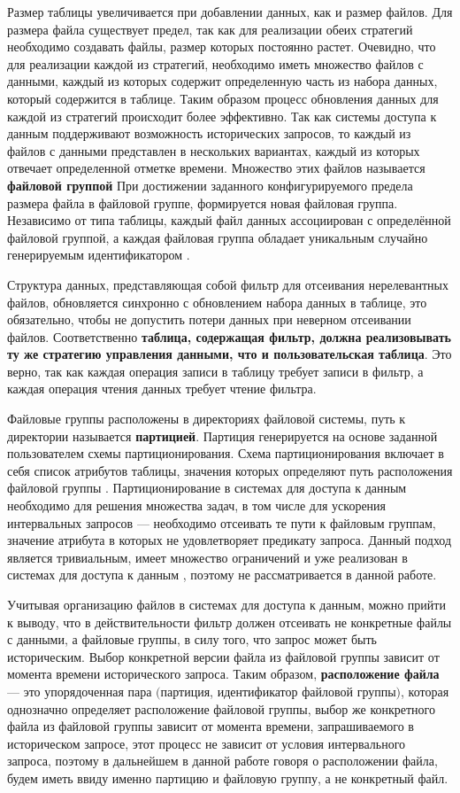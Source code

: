 Размер таблицы увеличивается при добавлении данных, как и размер файлов. Для размера файла существует предел, так как для реализации обеих стратегий необходимо создавать файлы, размер которых постоянно растет. Очевидно, что для реализации каждой из стратегий, необходимо иметь множество файлов с данными, каждый из которых содержит определенную часть из набора данных, который содержится в таблице. Таким образом процесс обновления данных для каждой из стратегий происходит более эффективно. Так как системы доступа к данным поддерживают возможность исторических запросов, то каждый из файлов с данными представлен в нескольких вариантах, каждый из которых отвечает определенной отметке времени. Множество этих файлов называется \textbf{файловой группой} При достижении заданного конфигурируемого предела размера файла в файловой группе, формируется новая файловая группа. Независимо от типа таблицы, каждый файл данных ассоциирован с определённой файловой группой, а каждая файловая группа обладает уникальным случайно генерируемым идентификатором \cite{Hudi_File_layouts}.

Структура данных, представляющая собой фильтр для отсеивания нерелевантных файлов, обновляется синхронно с обновлением набора данных в таблице, это обязательно, чтобы не допустить потери данных при неверном отсеивании файлов. Соответственно \textbf{таблица, содержащая фильтр, должна реализовывать ту же стратегию управления данными, что и пользовательская таблица}. Это верно, так как каждая операция записи в таблицу требует записи в фильтр, а каждая операция чтения данных требует чтение фильтра.

Файловые группы расположены в директориях файловой системы, путь к директории называется \textbf{партицией}. Партиция генерируется на основе заданной пользователем схемы партиционирования. Схема партиционирования включает в себя список атрибутов таблицы, значения которых определяют путь расположения файловой группы \cite{Hudi_File_layouts}. Партиционирование в системах для доступа к данным необходимо для решения множества задач, в том числе для ускорения интервальных запросов --- необходимо отсеивать те пути к файловым группам, значение атрибута в которых не удовлетворяет предикату запроса. Данный подход является тривиальным, имеет множество ограничений и уже реализован в системах для доступа к данным \cite{Spatial_big_data_architecture}, поэтому не рассматривается в данной работе.

Учитывая организацию файлов в системах для доступа к данным, можно прийти к выводу, что в действительности фильтр должен отсеивать не конкретные файлы с данными, а файловые группы, в силу того, что запрос может быть историческим. Выбор конкретной версии файла из файловой группы зависит от момента времени исторического запроса. Таким образом, \textbf{расположение файла} --- это упорядоченная пара $($партиция, идентификатор файловой группы$)$, которая однозначно определяет расположение файловой группы, выбор же конкретного файла из файловой группы зависит от момента времени, запрашиваемого в историческом запросе, этот процесс не зависит от условия интервального запроса, поэтому в дальнейшем в данной работе говоря о расположении файла, будем иметь ввиду именно партицию и файловую группу, а не конкретный файл. 
